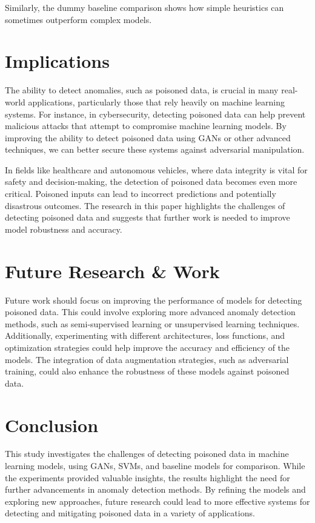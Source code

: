 \documentclass[14]{article}
\begin{document}
Similarly, the dummy baseline comparison shows how simple heuristics can sometimes outperform complex models.

\section{Implications}

The ability to detect anomalies, such as poisoned data, is crucial in many real-world applications, particularly those that rely heavily on machine learning systems. For instance, in cybersecurity, detecting poisoned data can help prevent malicious attacks that attempt to compromise machine learning models. By improving the ability to detect poisoned data using GANs or other advanced techniques, we can better secure these systems against adversarial manipulation.

In fields like healthcare and autonomous vehicles, where data integrity is vital for safety and decision-making, the detection of poisoned data becomes even more critical. Poisoned inputs can lead to incorrect predictions and potentially disastrous outcomes. The research in this paper highlights the challenges of detecting poisoned data and suggests that further work is needed to improve model robustness and accuracy.

\section{Future Research \& Work}

Future work should focus on improving the performance of models for detecting poisoned data. This could involve exploring more advanced anomaly detection methods, such as semi-supervised learning or unsupervised learning techniques. Additionally, experimenting with different architectures, loss functions, and optimization strategies could help improve the accuracy and efficiency of the models. The integration of data augmentation strategies, such as adversarial training, could also enhance the robustness of these models against poisoned data.

\section{Conclusion}

This study investigates the challenges of detecting poisoned data in machine learning models, using GANs, SVMs, and baseline models for comparison. While the experiments provided valuable insights, the results highlight the need for further advancements in anomaly detection methods. By refining the models and exploring new approaches, future research could lead to more effective systems for detecting and mitigating poisoned data in a variety of applications.

\nocite{jabbar2021survey}
\nocite{geiping2024datapoisoning}



\end{document}
